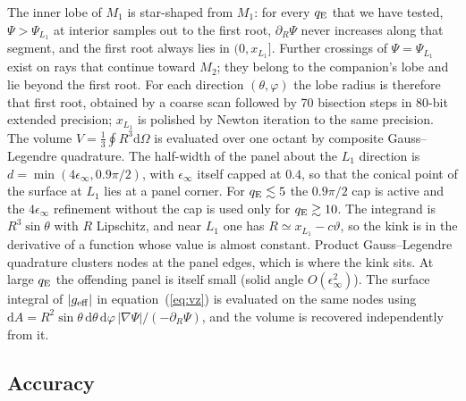 \documentclass[twocolumn]{aastex702}
\newcommand{\qE}{q_{\rm E}}
\newcommand{\dd}{\mathrm{d}}
\newcommand{\geff}{g_{\rm eff}}
\begin{document}
The inner lobe of $M_1$ is star-shaped from $M_1$: for every $\qE$ that we have tested, $\Psi>\Psi_{L_1}$ at interior samples out to the first root, $\partial_R\Psi$ never increases along that segment, and the first root always lies in $(0,x_{L_1}]$. Further crossings of $\Psi=\Psi_{L_1}$ exist on rays that continue toward $M_2$; they belong to the companion's lobe and lie beyond the first root. For each direction $(\theta,\varphi)$ the lobe radius is therefore that first root, obtained by a coarse scan followed by 70 bisection steps in 80-bit extended precision; $x_{L_1}$ is polished by Newton iteration to the same precision. The volume $V=\tfrac13\oint R^3\dd\Omega$ is evaluated over one octant by composite Gauss--Legendre quadrature. The half-width of the panel about the $L_1$ direction is $d=\min(4\epsilon_\infty,0.9\pi/2)$, with $\epsilon_\infty$ itself capped at $0.4$, so that the conical point of the surface at $L_1$ lies at a panel corner. For $\qE\lesssim5$ the $0.9\pi/2$ cap is active and the $4\epsilon_\infty$ refinement without the cap is used only for $\qE\gtrsim10$. The integrand is $R^3\sin\theta$ with $R$ Lipschitz, and near $L_1$ one has $R\simeq x_{L_1}-c\vartheta$, so the kink is in the derivative of a function whose value is almost constant. Product Gauss--Legendre quadrature clusters nodes at the panel edges, which is where the kink sits. At large $\qE$ the offending panel is itself small (solid angle $O(\epsilon_\infty^2)$). The surface integral of $|\geff|$ in equation~(\ref{eq:vz}) is evaluated on the same nodes using $\dd A=R^2\sin\theta\,\dd\theta\,\dd\varphi\,|\nabla\Psi|/(-\partial_R\Psi)$, and the volume is recovered independently from it.

\subsection{Accuracy}
\end{document}
